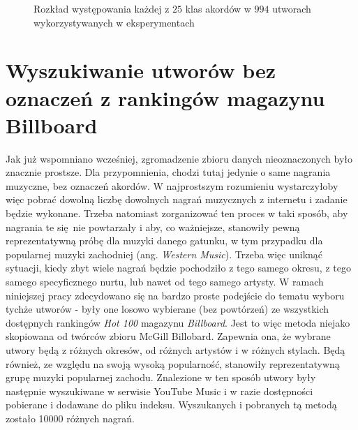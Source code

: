 \begin{figure}
    \centering
    \caption{Rozkład występowania każdej z $25$ klas akordów w $994$ utworach wykorzystywanych w eksperymentach}
    \label{fig:chords_histogram}
\end{figure}


\section{Wyszukiwanie utworów bez oznaczeń z rankingów magazynu Billboard}

Jak już wspomniano wcześniej, zgromadzenie zbioru danych nieoznaczonych było znacznie prostsze. Dla przypomnienia, chodzi tutaj jedynie o same nagrania muzyczne, bez oznaczeń akordów. W najprostszym rozumieniu wystarczyłoby więc pobrać dowolną liczbę dowolnych nagrań muzycznych z internetu i zadanie będzie wykonane. Trzeba natomiast zorganizować ten proces w taki sposób, aby nagrania te się nie powtarzały i aby, co ważniejsze, stanowiły pewną reprezentatywną próbę dla muzyki danego gatunku, w tym przypadku dla popularnej muzyki zachodniej (ang. \emph{Western Music}). Trzeba więc uniknąć sytuacji, kiedy zbyt wiele nagrań będzie pochodziło z tego samego okresu, z tego samego specyficznego nurtu, lub nawet od tego samego artysty. W ramach niniejszej pracy zdecydowano się na bardzo proste podejście do tematu wyboru tychże utworów - były one losowo wybierane (bez powtórzeń) ze wszystkich dostępnych rankingów \emph{Hot 100} magazynu \emph{Billboard}. Jest to więc metoda niejako skopiowana od twórców zbioru McGill Billobard. Zapewnia ona, że wybrane utwory będą z różnych okresów, od różnych artystów i w różnych stylach. Będą również, ze względu na swoją wysoką popularność, stanowiły reprezentatywną grupę muzyki popularnej zachodu. Znalezione w ten sposób utwory były następnie wyszukiwane w serwisie YouTube Music i w razie dostępności pobierane i dodawane do pliku indeksu. Wyszukanych i pobranych tą metodą zostało 10000 różnych nagrań.

